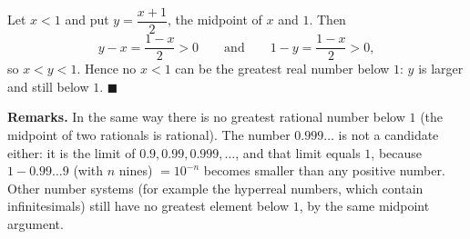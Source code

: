 Let $x<1$ and put $y=\dfrac{x+1}{2}$, the midpoint of $x$ and $1$. Then
\[
y-x=\dfrac{1-x}{2}>0\qquad\text{and}\qquad 1-y=\dfrac{1-x}{2}>0,
\]
so $x<y<1$. Hence no $x<1$ can be the greatest real number below $1$: $y$ is larger and still below $1$. $\blacksquare$

\textbf{Remarks.} In the same way there is no greatest rational number below $1$ (the midpoint of two rationals is rational). The number $0.999\ldots$ is not a candidate either: it is the limit of $0.9,0.99,0.999,\dots$, and that limit equals $1$, because $1-0.99\ldots9$ (with $n$ nines) $=10^{-n}$ becomes smaller than any positive number. Other number systems (for example the hyperreal numbers, which contain infinitesimals) still have no greatest element below $1$, by the same midpoint argument.
